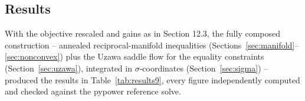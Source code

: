 \documentclass[11pt,onecolumn]{article}
\theoremstyle{definition}
\theoremstyle{remark}
\begin{document}

\subsection{Results}
With the objective rescaled and gains as in Section 12.3, the fully composed construction --
annealed reciprocal-manifold inequalities (Sections~\ref{sec:manifold}--\ref{sec:nonconvex})
plus the Uzawa saddle flow for the equality constraints (Section~\ref{sec:uzawa}), integrated
in $\sigma$-coordinates (Section~\ref{sec:sigma}) -- produced the results in
Table~\ref{tab:results9}, every figure independently computed and checked against the pypower
reference solve.
\end{document}
